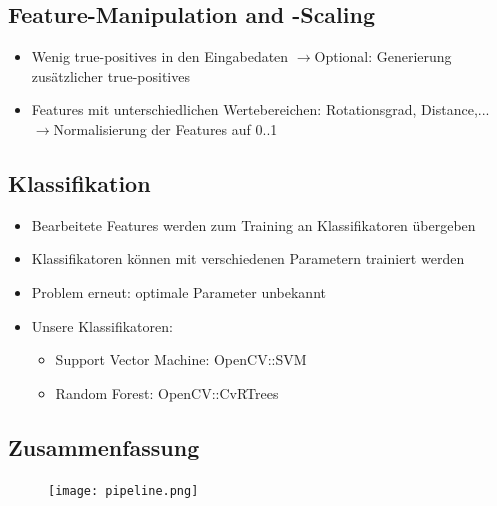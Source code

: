 \documentclass{beamer}
\begin{document}
\subsection{Feature-Manipulation and -Scaling}
\begin{frame}
  \begin{itemize}
    \item Wenig true-positives in den Eingabedaten\newline
          $\rightarrow$Optional: Generierung zusätzlicher true-positives
    \item Features mit unterschiedlichen Wertebereichen: Rotationsgrad, Distance,...\newline
          $\rightarrow$Normalisierung der Features auf 0..1
  \end{itemize}
\end{frame}

\subsection{Klassifikation}
\begin{frame}
  \begin{itemize}
    \item Bearbeitete Features werden zum Training an Klassifikatoren übergeben
    \item Klassifikatoren können mit verschiedenen Parametern trainiert werden
    \item Problem erneut: optimale Parameter unbekannt
    \item Unsere Klassifikatoren:
      \begin{itemize}
        \item Support Vector Machine: OpenCV::SVM
        \item Random Forest: OpenCV::CvRTrees
      \end{itemize}
  \end{itemize}
\end{frame}

\subsection{Zusammenfassung}
\begin{frame}[plain]
  \begin{figure}
    \texttt{[image: pipeline.png]}
  \end{figure}
\end{frame}
\end{document}
